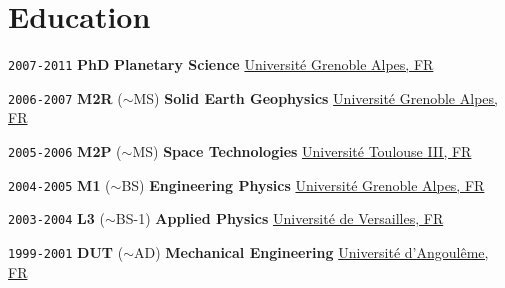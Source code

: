 \section*{Education}

\TabPositions{8em,11em,16em,29em}

\noindent \texttt{2007-2011}
\tab \textbf{PhD} 
\tab
\tab \textbf{Planetary Science} 
\tab \href{https://www.univ-grenoble-alpes.fr/}{Université Grenoble Alpes, FR}

\noindent \texttt{2006-2007}
\tab \textbf{M2R}
\tab ($\sim$MS)
\tab \textbf{Solid Earth Geophysics}
\tab \href{https://www.univ-grenoble-alpes.fr/}{Université Grenoble Alpes, FR}

\noindent \texttt{2005-2006}
\tab \textbf{M2P}
\tab ($\sim$MS)
\tab \textbf{Space Technologies}
\tab \href{https://www.univ-tlse3.fr/}{Université Toulouse III, FR}

\noindent \texttt{2004-2005}
\tab \textbf{M1}
\tab ($\sim$BS)
\tab \textbf{Engineering Physics}
\tab \href{https://www.univ-grenoble-alpes.fr/}{Université Grenoble Alpes, FR}

\noindent \texttt{2003-2004}
\tab \textbf{L3}
\tab ($\sim$BS-1)
\tab \textbf{Applied Physics}
\tab \href{http://www.sciences.uvsq.fr/}{Université de Versailles, FR}

\noindent \texttt{1999-2001}
\tab \textbf{DUT}
\tab ($\sim$AD)
\tab \textbf{Mechanical Engineering}
\tab \href{https://iut-angouleme.univ-poitiers.fr/}{Université d'Angoulême, FR}